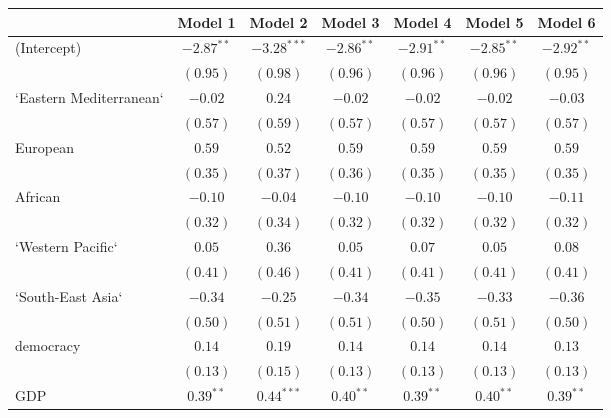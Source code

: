 
\begin{table}[!h]
\begin{center}
\begin{tabular}{l c c c c c c }
\toprule
 & Model 1 & Model 2 & Model 3 & Model 4 & Model 5 & Model 6 \\
\midrule
(Intercept)             & $-2.87^{**}$ & $-3.28^{***}$ & $-2.86^{**}$ & $-2.91^{**}$ & $-2.85^{**}$ & $-2.92^{**}$ \\
                        & $(0.95)$     & $(0.98)$      & $(0.96)$     & $(0.96)$     & $(0.96)$     & $(0.95)$     \\
`Eastern Mediterranean` & $-0.02$      & $0.24$        & $-0.02$      & $-0.02$      & $-0.02$      & $-0.03$      \\
                        & $(0.57)$     & $(0.59)$      & $(0.57)$     & $(0.57)$     & $(0.57)$     & $(0.57)$     \\
European                & $0.59$       & $0.52$        & $0.59$       & $0.59$       & $0.59$       & $0.59$       \\
                        & $(0.35)$     & $(0.37)$      & $(0.36)$     & $(0.35)$     & $(0.35)$     & $(0.35)$     \\
African                 & $-0.10$      & $-0.04$       & $-0.10$      & $-0.10$      & $-0.10$      & $-0.11$      \\
                        & $(0.32)$     & $(0.34)$      & $(0.32)$     & $(0.32)$     & $(0.32)$     & $(0.32)$     \\
`Western Pacific`       & $0.05$       & $0.36$        & $0.05$       & $0.07$       & $0.05$       & $0.08$       \\
                        & $(0.41)$     & $(0.46)$      & $(0.41)$     & $(0.41)$     & $(0.41)$     & $(0.41)$     \\
`South-East Asia`       & $-0.34$      & $-0.25$       & $-0.34$      & $-0.35$      & $-0.33$      & $-0.36$      \\
                        & $(0.50)$     & $(0.51)$      & $(0.51)$     & $(0.50)$     & $(0.51)$     & $(0.50)$     \\
democracy               & $0.14$       & $0.19$        & $0.14$       & $0.14$       & $0.14$       & $0.13$       \\
                        & $(0.13)$     & $(0.15)$      & $(0.13)$     & $(0.13)$     & $(0.13)$     & $(0.13)$     \\
GDP                     & $0.39^{**}$  & $0.44^{***}$  & $0.40^{**}$  & $0.39^{**}$  & $0.40^{**}$  & $0.39^{**}$  \\

\end{tabular}
\end{center}
\end{table}
